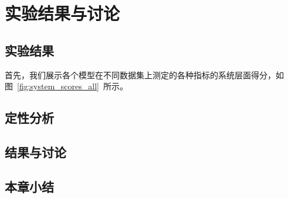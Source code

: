 \usepackage{graphicx}


\chapter{实验结果与讨论}\label{ch:experiment}

\section{实验结果}\label{sec:experiment_result}
首先，我们展示各个模型在不同数据集上测定的各种指标的系统层面得分，如图~\ref{fig:system_scores_all}~所示。

\begin{table}
    \centering
    \caption{}
    \label{}

\end{table}

\section{定性分析}\label{sec:qualitative_analysis}

\section{结果与讨论}\label{sec:result_and_discussion}

\section{本章小结}\label{sec:experiment_conclusion}
